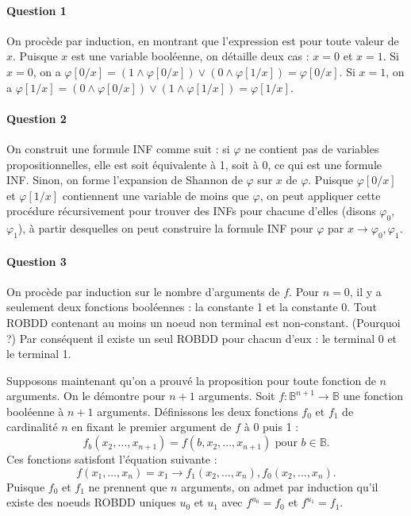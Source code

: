 \documentclass{article}
\begin{document}
\paragraph{Question 1}

On procède par induction, en montrant que l'expression est pour toute valeur de $x$. Puisque $x$ est une variable booléenne, on détaille deux cas : $x=0$ et $x=1$. Si $x=0$, on a $\varphi[0/x] = (1 \land \varphi[0/x]) \lor (0 \land \varphi[1/x]) = \varphi[0/x]$. Si $x=1$, on a $\varphi[1/x] = (0 \land \varphi[0/x]) \lor (1 \land \varphi[1/x]) = \varphi[1/x]$.

\paragraph{Question 2}

On construit une formule INF comme suit : si  $\varphi$ ne contient pas de variables propositionnelles, elle est soit équivalente à 1, soit à 0, ce qui est une formule INF. Sinon, on forme l'expansion de Shannon de $\varphi$ sur $x$ de $\varphi$. Puisque $\varphi[0/x]$ et $\varphi[1/x]$ contiennent une variable de moins que $\varphi$, on peut appliquer cette procédure récursivement pour trouver des INFs pour chacune d'elles (disons  $\varphi_0$, $\varphi_1$), à partir desquelles on peut construire la formule INF pour $\varphi$ par $x \rightarrow \varphi_0, \varphi_1$.

\paragraph{Question 3}

On procède par induction sur le nombre d'arguments de $f$. Pour $n=0$, il y a seulement deux fonctions booléennes : la constante 1 et la constante 0. Tout ROBDD contenant au moins un noeud non terminal est non-constant. (Pourquoi ?) Par conséquent il existe un seul ROBDD pour chacun d'eux : le terminal 0 et le terminal 1.

Supposons maintenant qu'on a prouvé la proposition pour toute fonction de $n$ arguments. On le démontre pour $n+1$ arguments. Soit $f \colon \mathbb{B}^{n+1} \to \mathbb{B}$ une fonction booléenne à $n+1$ arguments. Définissons les deux fonctions $f_0$ et $f_1$ de cardinalité $n$ en fixant le premier argument de $f$ à 0 puis 1 : \[ f_b(x_2, \dots, x_{n+1}) = f(b, x_2, \dots, x_{n+1})  \text{ pour }b\in\mathbb{B}. \] Ces fonctions satisfont l'équation suivante : \[ f(x_1, \dots, x_n) = x_1 \rightarrow f_1(x_2, \dots, x_n), f_0(x_2, \dots, x_n). \] Puisque $f_0$ et $f_1$ ne prennent que $n$ arguments, on admet par induction qu'il existe des noeuds ROBDD uniques $u_0$ et $u_1$ avec $f^{u_0} = f_0$ et $f^{u_1} = f_1$.
\end{document}
